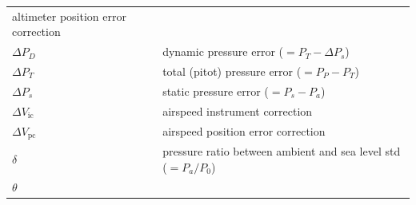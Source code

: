 \documentclass[
]{book}
\begin{document}
\begin{longtable}[]{@{}ll@{}}
\begin{minipage}[t]{0.72\columnwidth}
altimeter position error correction\strut
\end{minipage}\tabularnewline
\begin{minipage}[t]{0.22\columnwidth}\raggedright
\(\Delta P_D\)\strut
\end{minipage} & \begin{minipage}[t]{0.72\columnwidth}\raggedright
dynamic pressure error (\(=P_T-\Delta P_s\))\strut
\end{minipage}\tabularnewline
\begin{minipage}[t]{0.22\columnwidth}\raggedright
\(\Delta P_T\)\strut
\end{minipage} & \begin{minipage}[t]{0.72\columnwidth}\raggedright
total (pitot) pressure error (\(=P_P-P_T\))\strut
\end{minipage}\tabularnewline
\begin{minipage}[t]{0.22\columnwidth}\raggedright
\(\Delta P_s\)\strut
\end{minipage} & \begin{minipage}[t]{0.72\columnwidth}\raggedright
static pressure error (\(=P_s-P_a\))\strut
\end{minipage}\tabularnewline
\begin{minipage}[t]{0.22\columnwidth}\raggedright
\(\Delta V_{\mathrm{ic}}\)\strut
\end{minipage} & \begin{minipage}[t]{0.72\columnwidth}\raggedright
airspeed instrument correction\strut
\end{minipage}\tabularnewline
\begin{minipage}[t]{0.22\columnwidth}\raggedright
\(\Delta V_{\mathrm{pc}}\)\strut
\end{minipage} & \begin{minipage}[t]{0.72\columnwidth}\raggedright
airspeed position error correction\strut
\end{minipage}\tabularnewline
\begin{minipage}[t]{0.22\columnwidth}\raggedright
\(\delta\)\strut
\end{minipage} & \begin{minipage}[t]{0.72\columnwidth}\raggedright
pressure ratio between ambient and sea level std (\(=P_a/P_0\))\strut
\end{minipage}\tabularnewline
\begin{minipage}[t]{0.22\columnwidth}\raggedright
\(\theta\)\strut
\end{minipage} & \begin{minipage}[t]{0.72\columnwidth}\raggedright

\end{minipage}
\end{longtable}
\end{document}
